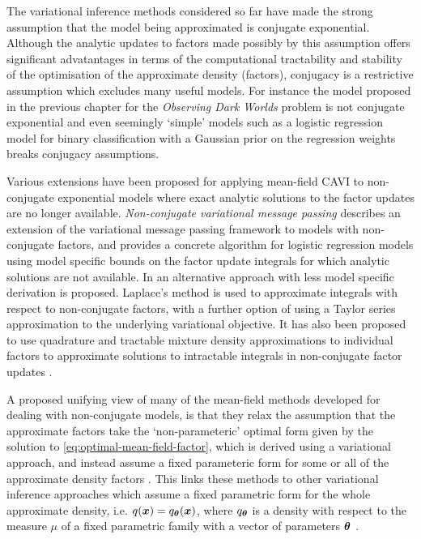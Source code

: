 The variational inference methods considered so far have made the strong assumption that the model being approximated is conjugate exponential. Although the analytic updates to factors made possibly by this assumption offers significant advatantages in terms of the computational tractability and stability of the optimisation of the approximate density (factors), conjugacy is a restrictive assumption which excludes many useful models. For instance the model proposed in the previous chapter for the \emph{Observing Dark Worlds} problem is not conjugate exponential and even seemingly `simple' models such as a logistic regression model for binary classification with a Gaussian prior on the regression weights breaks conjugacy assumptions.

Various extensions have been proposed for applying mean-field \ac{CAVI} to non-conjugate exponential models where exact analytic solutions to the factor updates are no longer available. \emph{Non-conjugate variational message passing} \citep{knowles2011non} describes an extension of the variational message passing framework to models with non-conjugate factors, and provides a concrete algorithm for logistic regression models using model specific bounds on the factor update integrals for which analytic solutions are not available. In \citep{wang2013variational} an alternative approach with less model specific derivation is proposed. Laplace's method is used to approximate integrals with respect to non-conjugate factors, with a further option of using a Taylor series approximation to the underlying variational objective. It has also been proposed to use quadrature and tractable mixture density approximations to individual factors to approximate solutions to intractable integrals in non-conjugate factor updates \citep{wand2011mean}. %

A proposed unifying view of many of the mean-field methods developed for dealing with non-conjugate models, is that they relax the assumption that the approximate factors take the `non-parameteric' optimal form given by the solution to \eqref{eq:optimal-mean-field-factor}, which is derived using a variational approach, and instead assume a fixed parameteric form for some or all of the approximate density factors \citep{rohde2016semiparametric}. This links these methods to other variational inference approaches which assume a fixed parametric form for the whole approximate density, i.e. $q(\boldsymbol{x}) = q_{\boldsymbol{\theta}}(\boldsymbol{x})$, where $q_{\boldsymbol{\theta}}$ is a density with respect to the measure $\mu$ of a fixed parametric family with a vector of parameters $\boldsymbol{\theta}$ \citep{graves2011practical,blei2012variational,salimans2013fixed,ranganath2014black,kucukelbir2016automatic}.   

